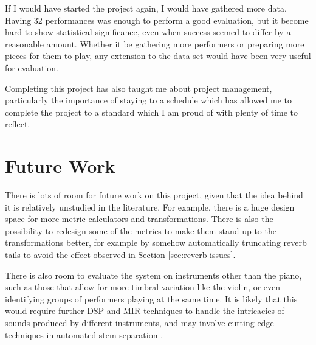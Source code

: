 \documentclass[oneside, class=book, 12pt, crop=false]{standalone}
\begin{document}
If I would have started the project again, I would have gathered more data. Having 32 performances was enough to perform a good evaluation, but it become hard to show statistical significance, even when success seemed to differ by a reasonable amount. Whether it be gathering more performers or preparing more pieces for them to play, any extension to the data set would have been very useful for evaluation.

Completing this project has also taught me about project management, particularly the importance of staying to a schedule which has allowed me to complete the project to a standard which I am proud of with plenty of time to reflect.

\section{Future Work}

There is lots of room for future work on this project, given that the idea behind it is relatively unstudied in the literature. For example, there is a huge design space for more metric calculators and transformations. There is also the possibility to redesign some of the metrics to make them stand up to the transformations better, for example by somehow automatically truncating reverb tails to avoid the effect observed in Section \ref{sec:reverb issues}.

There is also room to evaluate the system on instruments other than the piano, such as those that allow for more timbral variation like the violin, or even identifying groups of performers playing at the same time. It is likely that this would require further DSP and MIR techniques to handle the intricacies of sounds produced by different instruments, and may involve cutting-edge techniques in automated stem separation \cite{Hennequin2020}.


\ifstandalone
  \printbibliography
\fi
    
\end{document}
